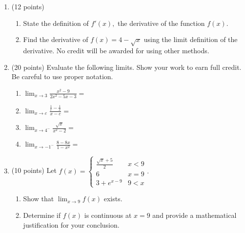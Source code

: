 \documentclass[12pt]{article}
\let\ds\displaystyle
\begin{document}
\newpage
\begin{enumerate}
\item (12 points)
	\begin{enumerate}
	\item State the definition of $f'(x),$ the derivative of the function $f(x).$
	\vspace{1in}
	\item Find the derivative of $f(x) = 4-\sqrt{x}$  using the limit definition of the derivative. No credit will be awarded for using other methods.
	\end{enumerate}

\newpage

\item (20 points) Evaluate the following limits. Show your work to earn full credit. Be careful to use proper notation.
	\begin{enumerate}
	\item $\ds \lim_{x \to 3} \frac{x^2-9}{2x^2-5x-3}=$
	\vfill
	\item $\displaystyle{\lim_{x \to c } \frac{\frac{1}{c}-\frac{1}{x}}{x-c}= }$
	\vfill
	\item $\displaystyle{\lim_{x \to 4^-} \frac{\sqrt{x}}{x^2 -2} =}$
	\vfill
	
	\item $\ds \lim_{x \to -1^-} \frac{8-8x}{1-x^2}=$ 
	\vfill
	\end{enumerate}


	
\newpage



\item (10 points) Let $f(x)=\begin{cases} \frac{\sqrt{x}+5}{2} & x<9 \\ 6 & x=9 \\ 3+e^{x-9} & 9<x  \end{cases}.$
	\begin{enumerate}
	\item Show that $\ds \lim_{x \to 9} f(x)$ exists.
	\vfill
	\item Determine if $f(x)$ is continuous at $x=9$ and provide a mathematical justification for your conclusion.
	\vfill
	\end{enumerate}
	

\end{enumerate}
\end{document}
